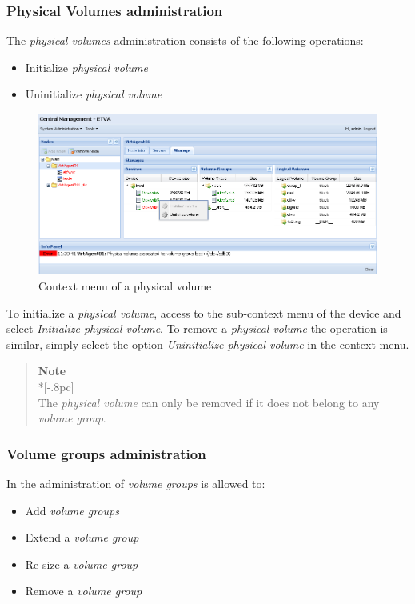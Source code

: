 
\subsubsection{Physical Volumes administration}
The \emph{physical volumes} administration consists of the following operations:
\begin{itemize}
	\item Initialize \emph{physical volume}
    \item Uninitialize \emph{physical volume}
\end{itemize}

\begin{figure}[H]
        \begin{center}
        \includegraphics[scale=0.45]{screenshots/node_storage_device_ctx.png}
        \caption{Context menu of a physical volume}
        \label{fig:storage_device_ctx}
        \end{center}
\end{figure}

To initialize a \emph{physical volume}, access to the sub-context menu of the device and select \emph{Initialize physical volume}. To remove a \emph{physical volume} the operation is similar, simply select the option \emph{Uninitialize physical volume} in the context menu.

\begin{quote}
	{\large \bf Note} \\*[-.8pc]
	\underline{\hspace{6in}} \\
    The \emph{physical volume} can only be removed if it does not belong to any \emph{volume group}.
\end{quote}


\subsubsection{Volume groups administration}
In the administration of \emph{volume groups} is allowed to:
\begin{itemize}
	\item Add \emph{volume groups}
	\item Extend a \emph{volume group}
	\item Re-size a \emph{volume group}
	\item Remove a \emph{volume group}
\end{itemize}

